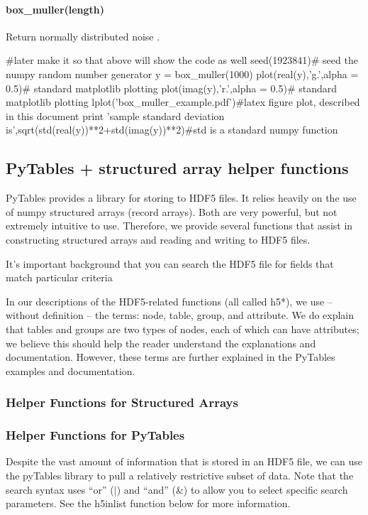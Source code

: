 \paragraph{box\_muller(length)}
Return normally distributed noise
    .

\begin{python}[showcode]
#later make it so that above will show the code as well
seed(1923841)# seed the numpy random number generator
y = box_muller(1000)
plot(real(y),'g.',alpha = 0.5)# standard matplotlib plotting
plot(imag(y),'r.',alpha = 0.5)# standard matplotlib plotting
lplot('box_muller_example.pdf')#latex figure plot, described in this document
print 'sample standard deviation is',sqrt(std(real(y))**2+std(imag(y))**2)#std is a standard numpy function
\end{python}
\subsection{PyTables + structured array helper functions}\label{sec:writeup_sofware_Pyspec_nonnddata}
PyTables provides a library for storing to HDF5 files.
It relies heavily on the use of numpy structured arrays (record arrays).
Both are very powerful, but not extremely intuitive to use.
Therefore, we provide several functions that assist in constructing
    structured arrays and reading and writing to HDF5 files.

It's important background that you can search the HDF5 file for
    fields that match particular criteria 

In our descriptions of the HDF5-related functions
    (all called h5*),
    we use -- without definition -- the terms:
    node,
    table,
    group,
    and
    attribute.
We do explain that tables and groups are two types of nodes,
    each of which can have attributes;
we believe this should help the reader understand
    the explanations and documentation.
However, these terms are further explained in the PyTables
    examples and documentation.
\subsubsection{Helper Functions for Structured Arrays}

\subsubsection{Helper Functions for PyTables}
Despite the vast amount of information that is stored in an HDF5
    file, we can use the pyTables library to pull a relatively
    restrictive subset of data.
Note that the search syntax uses ``or'' ($|$) and ``and'' (\&) 
    to allow you to select specific search parameters.
See the h5inlist function below for more information.

